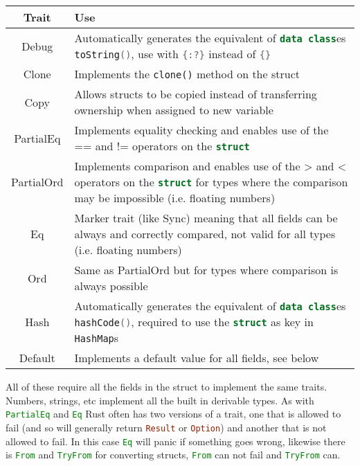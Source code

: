 \documentclass[a4paper,11pt]{article}
\begin{document}
\begin{center}
\begin{tabular}{ |c|p{12cm}| } 
 \hline
 Trait & Use \\ 
 \hline
 Debug & Automatically generates the equivalent of \lstinline[language=Kotlin]|data class|es \lstinline[language=Kotlin]|toString()|, use with \lstinline[language=Rust]|{:?}| instead of \lstinline[language=Rust]|{}| \\
 Clone & Implements the \lstinline[language=Rust]|clone()| method on the struct \\
 Copy & Allows structs to be copied instead of transferring ownership when assigned to new variable \\
 PartialEq & Implements equality checking and enables use of the == and != operators on the \lstinline[language=Rust]|struct| \\
 PartialOrd & Implements comparison and enables use of the > and < operators on the \lstinline[language=Rust]|struct| for types where the comparison may be impossible (i.e. floating numbers)\\
 Eq & Marker trait (like Sync) meaning that all fields can be always and correctly compared, not valid for all types (i.e. floating numbers) \\
 Ord & Same as PartialOrd but for types where comparison is always possible\\
 Hash & Automatically generates the equivalent of \lstinline[language=Kotlin]|data class|es \lstinline[language=Kotlin]|hashCode()|, required to use the \lstinline[language=Rust]|struct| as key in \lstinline[language=Rust]|HashMap|s \\
 Default & Implements a default value for all fields, see below \\
 \hline
\end{tabular}
\end{center}

All of these require all the fields in the struct to implement the same traits. Numbers, strings, etc implement all the built in derivable types. As with \lstinline[language=Rust]{PartialEq} and \lstinline[language=Rust]{Eq} Rust often has two versions of a trait, one that is allowed to fail (and so will generally return \lstinline[language=Rust]{Result} or \lstinline[language=Rust]{Option}) and another that is not allowed to fail. In this case \lstinline[language=Rust]{Eq} will panic if something goes wrong, likewise there is \lstinline[language=Rust]{From} and \lstinline[language=Rust]{TryFrom} for converting structs, \lstinline[language=Rust]{From} can not fail and \lstinline[language=Rust]{TryFrom} can.
\end{document}
